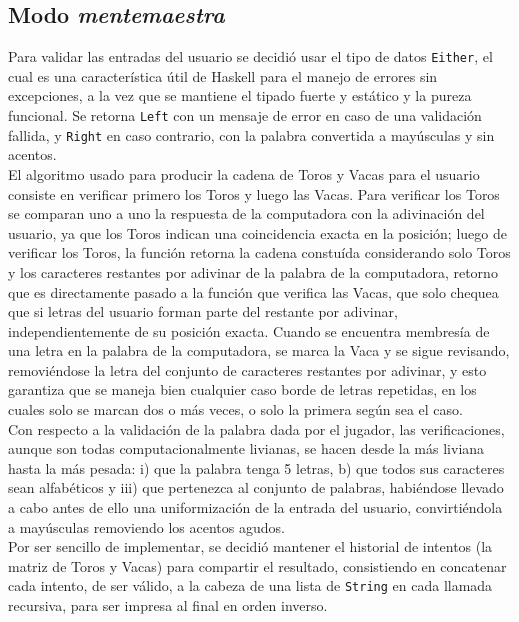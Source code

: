 \documentclass[11pt]{article}
\begin{document}
\subsection{Modo \emph{mentemaestra}}

Para validar las entradas del usuario se decidió usar el tipo de datos \texttt{Either}, el cual es una característica útil de Haskell para el manejo de errores sin excepciones, a la vez que se mantiene el tipado fuerte y estático y la pureza funcional. Se retorna \texttt{Left} con un mensaje de error en caso de una validación fallida, y \texttt{Right} en caso contrario, con la palabra convertida a mayúsculas y sin acentos. \\

El algoritmo usado para producir la cadena de Toros y Vacas para el usuario
consiste en verificar primero los Toros y luego las Vacas. Para verificar los 
Toros se comparan uno a uno la respuesta de la computadora con la adivinación 
del usuario, ya que los Toros indican una coincidencia exacta en la posición; 
luego de verificar los Toros, la función retorna la cadena constuída 
considerando solo Toros y los caracteres restantes por adivinar de la palabra 
de la computadora, retorno que es directamente pasado a la función que 
verifica las Vacas, que solo chequea que si letras del usuario forman parte 
del restante por adivinar, independientemente de su posición exacta. Cuando se 
encuentra membresía de una letra en la palabra de la computadora, se marca la 
Vaca y se sigue revisando, removiéndose la letra del conjunto de caracteres 
restantes por adivinar, y esto garantiza que se maneja bien cualquier caso 
borde de letras repetidas, en los cuales solo se marcan dos o más veces, o 
solo la primera según sea el caso. \\

Con respecto a la validación de la palabra dada por el jugador, las 
verificaciones, aunque son todas computacionalmente livianas, se hacen desde 
la más liviana hasta la más pesada: i) que la palabra tenga 5 letras, b) que 
todos sus caracteres sean alfabéticos y iii) que pertenezca al conjunto de 
palabras, habiéndose llevado a cabo antes de ello una uniformización de la 
entrada del usuario, convirtiéndola a mayúsculas removiendo los acentos agudos. \\

Por ser sencillo de implementar, se decidió mantener el historial de intentos (la matriz de Toros y Vacas) para compartir el resultado, consistiendo en concatenar cada intento, de ser válido, a la cabeza de una lista de \texttt{String} en cada llamada recursiva, para ser impresa al final en orden inverso.
\end{document}
